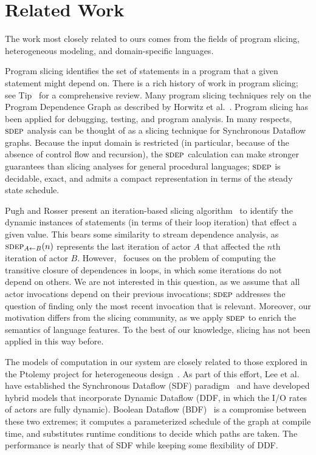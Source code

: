 \section{Related Work}
\label{sec:related-work}

The work most closely related to ours comes from the fields of program
slicing, heterogeneous modeling, and domain-specific languages.

Program slicing identifies the set of statements in a program that a
given statement might depend on.  There is a rich history of work in
program slicing; see Tip~\cite{tip95slice} for a comprehensive review.
Many program slicing techniques rely on the Program Dependence Graph
as described by Horwitz et al.~\cite{hrb88pdg}.  Program slicing has
been applied for debugging, testing, and program analysis.  In many
respects, $\textsc{sdep}$ analysis can be thought of as a slicing technique
for Synchronous Dataflow graphs.  Because the input domain is
restricted (in particular, because of the absence of control flow and
recursion), the $\textsc{sdep}$ calculation can make stronger guarantees than
slicing analyses for general procedural languages; $\textsc{sdep}$ is
decidable, exact, and admits a compact representation in terms of the
steady state schedule.

Pugh and Rosser present an iteration-based slicing
algorithm~\cite{pugh97slice} to identify the dynamic instances of
statements (in terms of their loop iteration) that effect a given
value.  This bears some similarity to stream dependence analysis, as
$\sdepf{A}{B}(n)$ represents the last iteration of actor $A$ that
affected the $n$th iteration of actor $B$.
However,~\cite{pugh97slice} focuses on the problem of computing the
transitive closure of dependences in loops, in which some iterations
do not depend on others.  We are not interested in this question, as
we assume that all actor invocations depend on their previous
invocations; $\textsc{sdep}$ addresses the question of finding only the most
recent invocation that is relevant.  Moreover, our motivation differs
from the slicing community, as we apply $\textsc{sdep}$ to enrich the
semantics of language features.  To the best of our knowledge, slicing
has not been applied in this way before.

The models of computation in our system are closely related to those
explored in the Ptolemy project for heterogeneous
design~\cite{ptolemy03overview}.  As part of this effort, Lee et
al. have established the Synchronous Dataflow (SDF)
paradigm~\cite{LM87-i} and have developed hybrid models that
incorporate Dynamic Dataflow (DDF, in which the I/O rates of actors
are fully dynamic).  Boolean Dataflow (BDF)~\cite{ha97profile} is a
compromise between these two extremes; it computes a parameterized
schedule of the graph at compile time, and substitutes runtime
conditions to decide which paths are taken.  The performance is nearly
that of SDF while keeping some flexibility of DDF.  


